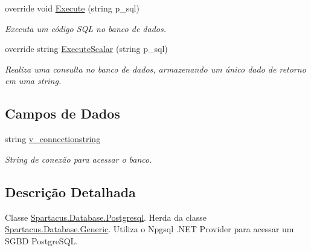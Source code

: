\begin{DoxyCompactItemize}
override void \hyperlink{classSpartacus_1_1Database_1_1Postgresql_a30357f4e3fc07945f58f9bdad4843460}{Execute} (string p\+\_\+sql)
\begin{DoxyCompactList}\small\item\em Executa um código S\+Q\+L no banco de dados. \end{DoxyCompactList}\item 
override string \hyperlink{classSpartacus_1_1Database_1_1Postgresql_a4c0c196e35ba1253d5b5783c26c93d08}{Execute\+Scalar} (string p\+\_\+sql)
\begin{DoxyCompactList}\small\item\em Realiza uma consulta no banco de dados, armazenando um único dado de retorno em uma string. \end{DoxyCompactList}\end{DoxyCompactItemize}
\subsection*{Campos de Dados}
\begin{DoxyCompactItemize}
\item 
string \hyperlink{classSpartacus_1_1Database_1_1Postgresql_a59cdb5e07bd009279982ef91dc98724f}{v\+\_\+connectionstring}
\begin{DoxyCompactList}\small\item\em String de conexão para acessar o banco. \end{DoxyCompactList}\end{DoxyCompactItemize}


\subsection{Descrição Detalhada}
Classe \hyperlink{classSpartacus_1_1Database_1_1Postgresql}{Spartacus.\+Database.\+Postgresql}. Herda da classe \hyperlink{classSpartacus_1_1Database_1_1Generic}{Spartacus.\+Database.\+Generic}. Utiliza o Npgsql .N\+E\+T Provider para acessar um S\+G\+B\+D Postgre\+S\+Q\+L. 



